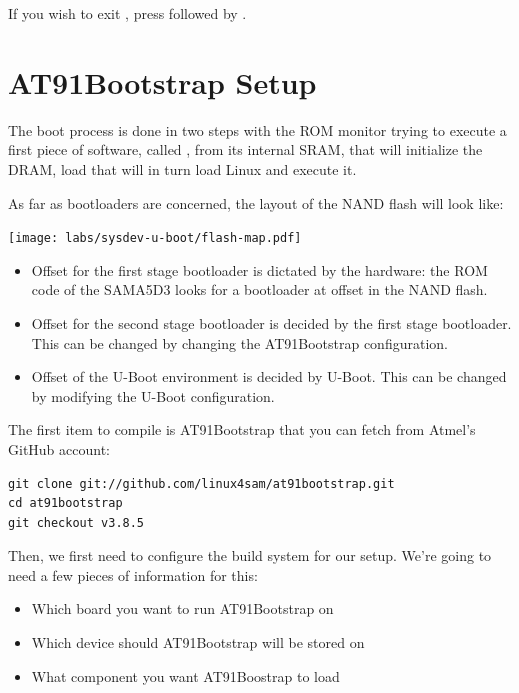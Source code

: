 If you wish to exit , press \code{[Ctrl][a]} followed by
\code{[Ctrl][x]}.

\section{AT91Bootstrap Setup}

The boot process is done in two steps with the ROM monitor trying to
execute a first piece of software, called , from
its internal SRAM, that will initialize the DRAM, load 
that will in turn load Linux and execute it.

As far as bootloaders are concerned, the layout of the NAND flash will
look like:

\begin{center}
  \texttt{[image: labs/sysdev-u-boot/flash-map.pdf]}
\end{center}

\begin{itemize}
\item Offset  for the first stage bootloader is dictated by
  the hardware: the ROM code of the SAMA5D3 looks for a bootloader at
  offset  in the NAND flash.
\item Offset  for the second stage bootloader is decided
  by the first stage bootloader. This can be changed by changing the
  AT91Bootstrap configuration.
\item Offset  of the U-Boot environment is decided by
  U-Boot. This can be changed by modifying the U-Boot configuration.
\end{itemize}

The first item to compile is AT91Bootstrap that you can fetch from
Atmel's GitHub account:

\begin{verbatim}
git clone git://github.com/linux4sam/at91bootstrap.git
cd at91bootstrap
git checkout v3.8.5
\end{verbatim}

Then, we first need to configure the build system for our setup. We're
going to need a few pieces of information for this:

\begin{itemize}
\item Which board you want to run AT91Bootstrap on
\item Which device should AT91Bootstrap will be stored on
\item What component you want AT91Boostrap to load
\end{itemize}


